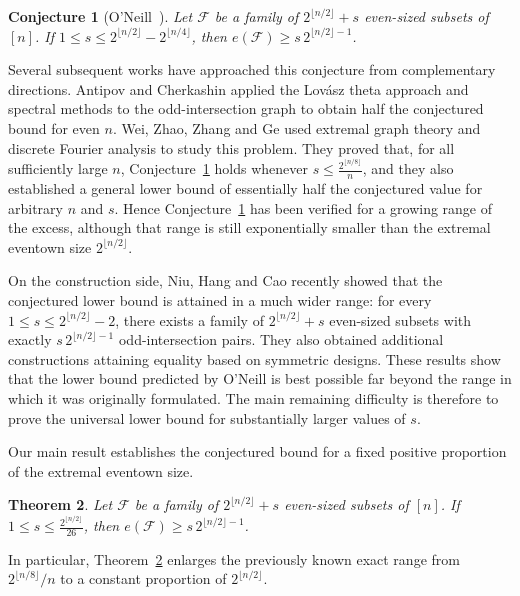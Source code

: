\documentclass[11pt]{article}
\newtheorem{theorem}{Theorem}[section]
\newtheorem{conjecture}[theorem]{Conjecture}
\begin{document}
\begin{conjecture}[O'Neill~\cite{ONeill}]\label{conj:oneill}
Let \(\mathcal F\) be a family of
\(2^{\lfloor n/2\rfloor}+s\) even-sized subsets of \([n]\). If
\(1\le s\le
2^{\lfloor n/2\rfloor}-2^{\lfloor n/4\rfloor}\), then
\(e(\mathcal F)\ge s\,2^{\lfloor n/2\rfloor-1}\).
\end{conjecture}

Several subsequent works have approached this conjecture from complementary directions.  Antipov and Cherkashin \cite{AntipovCherkashin} applied the
Lov\'asz theta approach and spectral methods to the odd-intersection graph to obtain half the conjectured bound for even \(n\).  Wei, Zhao, Zhang and Ge \cite{WeiZhaoZhangGe} used extremal graph theory and discrete Fourier analysis to study this problem. They proved that, for
all sufficiently large \(n\), Conjecture~\ref{conj:oneill} holds whenever \(s\le \frac{2^{\lfloor n/8\rfloor}}{n}\), and they also established a general lower bound of essentially half the conjectured value for arbitrary \(n\) and \(s\).  Hence Conjecture~\ref{conj:oneill} has been verified for a growing range of the excess, although that range is still exponentially smaller than the extremal eventown size
\(2^{\lfloor n/2\rfloor}\).

On the construction side, Niu, Hang and Cao \cite{NiuHangCao} recently showed
that the conjectured lower bound is attained in a much wider range: for
every \(1\le s\le 2^{\lfloor n/2\rfloor}-2\), there exists a family of \(2^{\lfloor n/2\rfloor}+s\) even-sized subsets with exactly \(s\,2^{\lfloor n/2\rfloor-1}\) odd-intersection pairs. They also obtained additional constructions attaining equality based on symmetric designs.  These results show that the lower bound predicted by O'Neill is best possible far beyond the range in which it was originally formulated.  The main remaining difficulty is therefore to prove the universal lower bound for substantially larger values of \(s\).

Our main result establishes the conjectured bound for a fixed positive
proportion of the extremal eventown size.

\begin{theorem}\label{thm:main}
Let \(\mathcal F\) be a family of
\(2^{\lfloor n/2\rfloor}+s\) even-sized subsets of \([n]\).  If
\(1\le s\le \frac{2^{\lfloor n/2\rfloor}}{26}\), then
\(e(\mathcal F)\ge s\,2^{\lfloor n/2\rfloor-1}\).
\end{theorem}

In particular, Theorem~\ref{thm:main} enlarges the previously known exact
range from \(2^{\lfloor n/8\rfloor}/n\) to a constant proportion of
\(2^{\lfloor n/2\rfloor}\).
\end{document}
